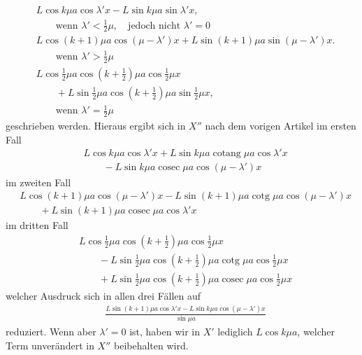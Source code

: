 \[
\begin{aligned}
&L\cos k\mu a\cos\lambda'x-L\sin k\mu a\sin\lambda'x,
\\[5pt]
&\qquad\text{wenn }\lambda'<\tfrac12\mu,\quad\text{jedoch nicht }\lambda'=0\\[5pt]
&L\cos(k+1)\mu a\cos(\mu-\lambda')x+L\sin(k+1)\mu a\sin(\mu-\lambda')x.
\\[5pt]
&\qquad\text{wenn }\lambda'>\tfrac12\mu\\[5pt]
&L\cos\tfrac12\mu a\cos(k+\tfrac12)\mu a\cos\tfrac12\mu x\\[5pt]
&\qquad{}+L\sin\tfrac12\mu a\cos(k+\tfrac12)\mu a\sin\tfrac12\mu x,
\\[5pt]
&\qquad\text{wenn }\lambda'=\tfrac12\mu
\end{aligned}
\]
geschrieben werden. 
Hieraus ergibt sich in $X''$ nach dem vorigen Artikel im ersten Fall
\[
\begin{aligned}
&L\cos k\mu a\cos\lambda'x+L\sin k\mu a\operatorname{cotang}\mu a\cos\lambda'x\\[5pt]
&\qquad{}-L\sin k\mu a\operatorname{cosec}\mu a\cos(\mu-\lambda')x
\end{aligned}
\]
im zweiten Fall
\[
\begin{aligned}
&L\cos(k+1)\mu a\cos(\mu-\lambda')x-L\sin(k+1)\mu a\operatorname{cotg}\mu a\cos(\mu-\lambda')x\\[5pt]
&\qquad+L\sin(k+1)\mu a\operatorname{cosec}\mu a\cos\lambda'x
\end{aligned}
\]
im dritten Fall
\[
\begin{aligned}
&L\cos\tfrac12\mu a\cos(k+\tfrac12)\mu a\cos\tfrac12\mu x\\[5pt]
&\qquad{}-L\sin\tfrac12\mu a\cos(k+\tfrac12)\mu a\operatorname{cotg}\mu a\cos\tfrac12\mu x\\[5pt]
&\qquad+L\sin\tfrac12\mu a\cos(k+\tfrac12)\mu a\operatorname{cosec}\mu a\cos\tfrac12\mu x
\end{aligned}
\]
welcher Ausdruck sich in allen drei Fällen auf
\[
\begin{aligned}
&\frac{L\sin(k+1)\mu a\cos\lambda'x-L\sin k\mu a\cos(\mu-\lambda')x}{\sin\mu a}
\end{aligned}
\]
reduziert. Wenn aber $\lambda'=0$ ist, haben wir in $X'$ lediglich $L\cos k\mu a$, welcher Term unverändert in $X''$ beibehalten wird.

\endgroup
